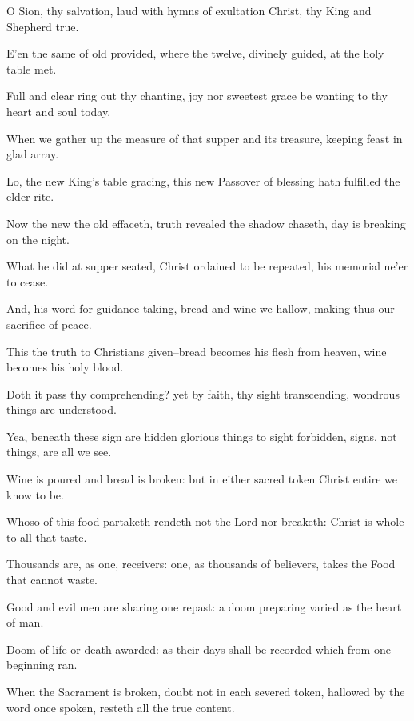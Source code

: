 \begin{multicols}{2}
 O Sion, thy salvation, laud with hymns of exultation Christ, thy King and Shepherd true.\par
{}
E'en the same of old provided, where the twelve, divinely guided, at the holy table met.\par
Full and clear ring out thy chanting, joy nor sweetest grace be wanting to thy heart and soul today.\par
When we gather up the measure of that supper and its treasure, keeping feast in glad array.\par
Lo, the new King's table gracing, this new Passover of blessing hath fulfilled the elder rite.\par
Now the new the old effaceth, truth revealed the shadow chaseth, day is breaking on the night.\par
What he did at supper seated, Christ ordained to be repeated, his memorial ne'er to cease.\par
And, his word for guidance taking, bread and wine we hallow, making thus our sacrifice of peace.\par
This the truth to Christians given--bread becomes his flesh from heaven, wine becomes his holy blood.\par
Doth it pass thy comprehending? yet by faith, thy sight transcending, wondrous things are understood.\par
Yea, beneath these sign are hidden glorious things to sight forbidden, signs, not things, are all we see.\par
Wine is poured and bread is broken: but in either sacred token Christ entire we know to be.\par
Whoso of this food partaketh rendeth not the Lord nor breaketh: Christ is whole to all that taste.\par
Thousands are, as one, receivers: one, as thousands of believers, takes the Food that cannot waste.\par
Good and evil men are sharing one repast: a doom preparing varied as the heart of man.\par
Doom of life or death awarded: as their days shall be recorded which from one beginning ran.\par
When the Sacrament is broken, doubt not in each severed token, hallowed by the word once spoken, resteth all the true content.\par

\end{multicols}
